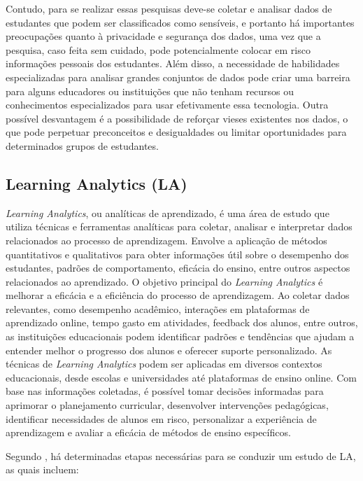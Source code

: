 Contudo, para se realizar essas pesquisas deve-se coletar e analisar dados de estudantes que podem ser classificados como sensíveis, e portanto há importantes preocupações quanto à privacidade e segurança dos dados, uma vez que a pesquisa, caso feita sem cuidado, pode potencialmente colocar em risco informações pessoais dos estudantes. Além disso, a necessidade de habilidades especializadas para analisar grandes conjuntos de dados pode criar uma barreira para alguns educadores ou instituições que não tenham recursos ou conhecimentos especializados para usar efetivamente essa tecnologia. Outra possível desvantagem é a possibilidade de reforçar vieses existentes nos dados, o que pode perpetuar preconceitos e desigualdades ou limitar oportunidades para determinados grupos de estudantes.



\subsection{Learning Analytics (LA)}

\textit{Learning Analytics}, ou {analíticas de aprendizado}, é uma área de estudo que utiliza técnicas e ferramentas analíticas para coletar, analisar e interpretar dados relacionados ao processo de aprendizagem. Envolve a aplicação de métodos quantitativos e qualitativos para obter informações útil sobre o desempenho dos estudantes, padrões de comportamento, eficácia do ensino, entre outros aspectos relacionados ao aprendizado. O objetivo principal do \textit{Learning Analytics} é melhorar a eficácia e a eficiência do processo de aprendizagem. Ao coletar dados relevantes, como desempenho acadêmico, interações em plataformas de aprendizado online, tempo gasto em atividades, feedback dos alunos, entre outros, as instituições educacionais podem identificar padrões e tendências que ajudam a entender melhor o progresso dos alunos e oferecer suporte personalizado. As técnicas de \textit{Learning Analytics} podem ser aplicadas em diversos contextos educacionais, desde escolas e universidades até plataformas de ensino online. Com base nas informações coletadas, é possível tomar decisões informadas para aprimorar o planejamento curricular, desenvolver intervenções pedagógicas, identificar necessidades de alunos em risco, personalizar a experiência de aprendizagem e avaliar a eficácia de métodos de ensino específicos.

{Segundo , há determinadas etapas necessárias para se conduzir um estudo de LA, as quais incluem:}

